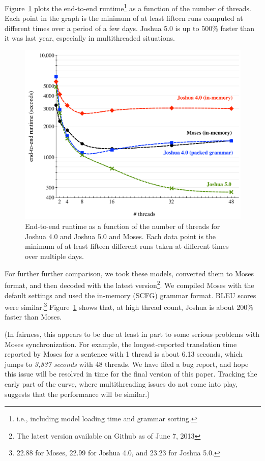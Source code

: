 \documentclass[11pt]{article}
\begin{document}
Figure~\ref{fig:cmp} plots the end-to-end runtime\footnote{i.e.,
  including model loading time and grammar sorting.} as a function of
the number of threads.  Each point in the graph is the minimum of at
least fifteen runs computed at different times over a period of a few
days.  Joshua 5.0 is up to 500\% faster than it was last year,
especially in multithreaded situations.

\begin{figure}[!t]
  \begin{center}
    \includegraphics[width=0.99\linewidth]{figures/comparison.pdf}
  \end{center}
  \caption{End-to-end runtime as a function of the number of threads
    for Joshua 4.0 and Joshua 5.0 and Moses. Each data point is the
    minimum of at least fifteen different runs taken at different
    times over multiple days.}
  \label{fig:cmp}
\end{figure}

For further further comparison, we took these models, converted them
to Moses format, and then decoded with the latest version\footnote{The
  latest version available on Github as of June 7, 2013}.  We compiled
Moses with the default settings and used the in-memory (SCFG) grammar
format.  BLEU scores were similar.\footnote{22.88 for Moses, 22.99 for
  Joshua 4.0, and 23.23 for Joshua 5.0.}  Figure~\ref{fig:cmp} shows
that, at high thread count, Joshua is about 200\% faster than
Moses.

(In fairness, this appears to be due at least in part to some serious
problems with Moses synchronization. For example, the longest-reported
translation time reported by Moses for a sentence with 1 thread is
about 6.13 seconds, which jumps to \emph{3,837 seconds} with 48
threads. We have filed a bug report, and hope this issue will be
resolved in time for the final version of this paper. Tracking the
early part of the curve, where multithreading issues do not come into
play, suggests that the performance will be similar.)
\end{document}
